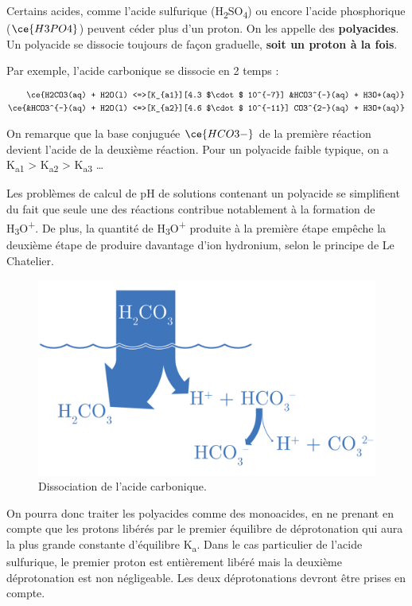 \documentclass[
  11pt,
  a4paper,
  openany]{book}
\begin{document}
Certains acides, comme l'acide sulfurique (H\textsubscript{2}SO\textsubscript{4}) ou encore l'acide phosphorique (\(\ce{H3PO4}\)) peuvent céder plus d'un proton. On les appelle des \textbf{polyacides}. Un polyacide se dissocie toujours de façon graduelle, \textbf{soit un proton à la fois}.

Par exemple, l'acide carbonique se dissocie en 2 temps :

\[
\begin{split}
\ce{H2CO3(aq) + H2O(l) <=>[K_{a1}][4.3 $\cdot$ 10^{-7}] &HCO3^{-}(aq) + H3O+(aq)} \\
\ce{&HCO3^{-}(aq) + H2O(l) <=>[K_{a2}][4.6 $\cdot$ 10^{-11}] CO3^{2-}(aq) + H3O+(aq)}
\end{split}
\]

On remarque que la base conjuguée \(\ce{HCO3-}\) de la première réaction devient l'acide de la deuxième réaction. Pour un polyacide faible typique, on a K\textsubscript{a1} \textgreater{} K\textsubscript{a2} \textgreater{} K\textsubscript{a3} \ldots{}

Les problèmes de calcul de pH de solutions contenant un polyacide se simplifient du fait que seule une des réactions contribue notablement à la formation de H\textsubscript{3}O\textsuperscript{+}. De plus, la quantité de H\textsubscript{3}O\textsuperscript{+} produite à la première étape empêche la deuxième étape de produire davantage d'ion hydronium, selon le principe de Le Chatelier.

\begin{figure}

{\centering \includegraphics[width=0.5\linewidth]{images/acides-faibles-2} 

}

\caption{Dissociation de l'acide carbonique.}\label{fig:acides-faibles-2}
\end{figure}

On pourra donc traiter les polyacides comme des monoacides, en ne prenant en compte que les protons libérés par le premier équilibre de déprotonation qui aura la plus grande constante d'équilibre K\textsubscript{a}. Dans le cas particulier de l'acide sulfurique, le premier proton est entièrement libéré mais la deuxième déprotonation est non négligeable. Les deux déprotonations devront être prises en compte.
\end{document}
